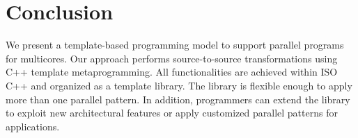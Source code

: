 \section{Conclusion}\label{sec:con}


We present a template-based programming model to support parallel
programs for multicores. Our approach performs source-to-source
transformations using C++ template metaprogramming. All functionalities
are achieved within ISO C++ and organized as a template library. The
library is flexible enough to
apply more than one parallel
pattern. In addition, programmers can extend the library to
exploit new architectural
features or apply customized parallel patterns for applications.




